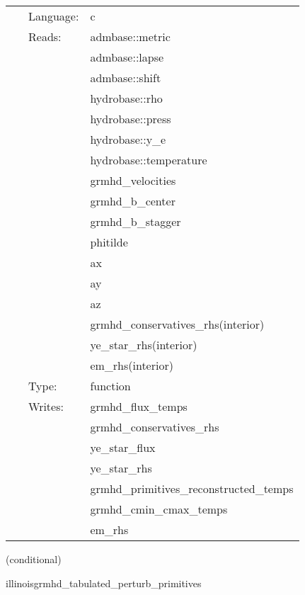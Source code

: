 \hspace{5mm}

 \begin{tabular*}{160mm}{cll} 
~ & Language:  & c \\ 
~ & Reads:  & admbase::metric \\ 
~& ~ &admbase::lapse\\ 
~& ~ &admbase::shift\\ 
~& ~ &hydrobase::rho\\ 
~& ~ &hydrobase::press\\ 
~& ~ &hydrobase::y\_e\\ 
~& ~ &hydrobase::temperature\\ 
~& ~ &grmhd\_velocities\\ 
~& ~ &grmhd\_b\_center\\ 
~& ~ &grmhd\_b\_stagger\\ 
~& ~ &phitilde\\ 
~& ~ &ax\\ 
~& ~ &ay\\ 
~& ~ &az\\ 
~& ~ &grmhd\_conservatives\_rhs(interior)\\ 
~& ~ &ye\_star\_rhs(interior)\\ 
~& ~ &em\_rhs(interior)\\ 
~ & Type:  & function \\ 
~ & Writes:  & grmhd\_flux\_temps \\ 
~& ~ &grmhd\_conservatives\_rhs\\ 
~& ~ &ye\_star\_flux\\ 
~& ~ &ye\_star\_rhs\\ 
~& ~ &grmhd\_primitives\_reconstructed\_temps\\ 
~& ~ &grmhd\_cmin\_cmax\_temps\\ 
~& ~ &em\_rhs\\ 
\end{tabular*} 


\vspace{5mm}

   (conditional) 

\hspace{5mm} illinoisgrmhd\_tabulated\_perturb\_primitives 

\hspace{5mm}{\it tabulated version of illinoisgrmhd\_perturb\_primitives } 


\hspace{5mm}

